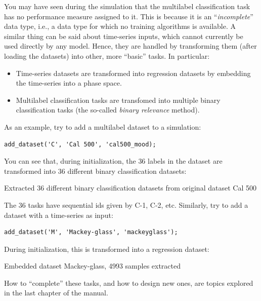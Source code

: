 You may have seen during the simulation that the multilabel classification task has no performance measure assigned to it. This is because it is an ``\textit{incomplete}'' data type, i.e., a data type for which no training algorithms is available. A similar thing can be said about time-series inputs, which cannot currently be used directly by any model. Hence, they are handled by transforming them (after loading the datasets) into other, more ``basic'' tasks. In particular:

\begin{itemize}
\item Time-series datasets are transformed into regression datasets by embedding the time-series into a phase space.
\item Multilabel classification tasks are transfomed into multiple binary classification tasks (the so-called \textit{binary relevance} method).
\end{itemize}

As an example, try to add a multilabel dataset to a simulation:

\begin{lstlisting}
add_dataset('C', 'Cal 500', 'cal500_mood);
\end{lstlisting}

\noindent You can see that, during initialization, the $36$ labels in the dataset are transformed into $36$ different binary classification datasets:

\begin{console}
Extracted 36 different binary classification datasets from original
  dataset Cal 500
\end{console}

\noindent The $36$ tasks have sequential ids given by C-1, C-2, etc. Similarly, try to add a dataset with a time-series as input:

\begin{lstlisting}
add_dataset('M', 'Mackey-glass', 'mackeyglass');
\end{lstlisting}

\noindent During initialization, this is transformed into a regression dataset:

\begin{console}
Embedded dataset Mackey-glass, 4993 samples extracted
\end{console}

How to ``complete'' these tasks, and how to design new ones, are topics explored in the last chapter of the manual.

